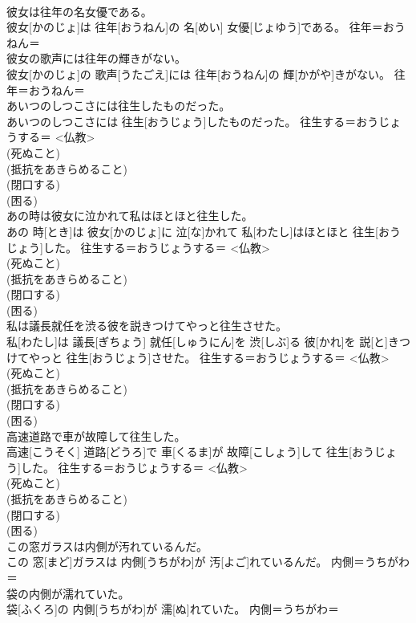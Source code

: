 \documentclass[8pt]{extreport}
\begin{document}
\begin{CJK}{UTF8}{min}
{\\	彼女は往年の名女優である。	
\\	彼女[かのじょ]は 往年[おうねん]の 名[めい] 女優[じょゆう]である。	往年＝おうねん＝ 
\\	彼女の歌声には往年の輝きがない。	
\\	彼女[かのじょ]の 歌声[うたごえ]には 往年[おうねん]の 輝[かがや]きがない。	往年＝おうねん＝ 
\\	あいつのしつこさには往生したものだった。	
\\	あいつのしつこさには 往生[おうじょう]したものだった。	往生する＝おうじょうする＝ <仏教> 
\\	(死ぬこと) 
\\	(抵抗をあきらめること) 
\\	(閉口する) 
\\	(困る) 
\\	あの時は彼女に泣かれて私はほとほと往生した。	
\\	あの 時[とき]は 彼女[かのじょ]に 泣[な]かれて 私[わたし]はほとほと 往生[おうじょう]した。	往生する＝おうじょうする＝ <仏教> 
\\	(死ぬこと) 
\\	(抵抗をあきらめること) 
\\	(閉口する) 
\\	(困る) 
\\	私は議長就任を渋る彼を説きつけてやっと往生させた。	
\\	私[わたし]は 議長[ぎちょう] 就任[しゅうにん]を 渋[しぶ]る 彼[かれ]を 説[と]きつけてやっと 往生[おうじょう]させた。	往生する＝おうじょうする＝ <仏教> 
\\	(死ぬこと) 
\\	(抵抗をあきらめること) 
\\	(閉口する) 
\\	(困る) 
\\	高速道路で車が故障して往生した。	
\\	高速[こうそく] 道路[どうろ]で 車[くるま]が 故障[こしょう]して 往生[おうじょう]した。	往生する＝おうじょうする＝ <仏教> 
\\	(死ぬこと) 
\\	(抵抗をあきらめること) 
\\	(閉口する) 
\\	(困る) 
\\	この窓ガラスは内側が汚れているんだ。	
\\	この 窓[まど]ガラスは 内側[うちがわ]が 汚[よご]れているんだ。	内側＝うちがわ＝ 
\\	袋の内側が濡れていた。	
\\	袋[ふくろ]の 内側[うちがわ]が 濡[ぬ]れていた。	内側＝うちがわ＝ 
}
\end{CJK}
\end{document}
